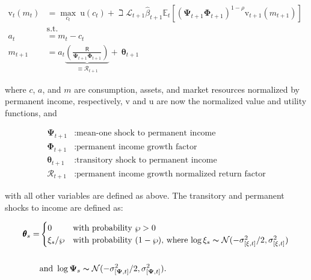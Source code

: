 \documentclass{article}
\newcommand{\DiscFac}{\beta}
\newcommand{\uFunc}{\mathrm{u}}
\newcommand{\vFunc}{\mathrm{v}}
\newcommand{\Alive}{\mathcal{L}}
\newcommand{\Ex}{\mathbb{E}}
\newcommand{\CRRA}{\rho}
\newcommand{\PermGroFac}{\pmb{\Phi}}
\newcommand{\Rfree}{\mathsf{R}}
\newcommand{\PermShk}{\mathbf{\Psi}}
\newcommand{\aNrm}{a}
\newcommand{\cNrm}{c}
\newcommand{\RNrm}{\mathcal{R}}
\newcommand{\TranShkEmp}{\pmb{\theta}}
\newcommand{\mNrm}{m}
\newcommand{\pZero}{\wp}
\begin{document}
\begin{equation}
\begin{align}
    {\vFunc}_{t}({m}_{t}) & = \max_{\cNrm_{t}} ~ \uFunc(\cNrm_{t})+\beth\Alive_{t+1}\hat{\DiscFac}_{t+1}
    \Ex_{t}[(\PermShk_{t+1}\PermGroFac_{t+1})^{1-\CRRA}{\vFunc}_{t+1}({m}_{t+1})]
    \\ & \text{s.t.} & 
    \\ \aNrm_{t} & = {m}_{t}-\cNrm_{t} 
    \\ {m}_{t+1} & = \aNrm_{t}\underbrace{\left(\frac{\Rfree}{\PermShk_{t+1}\PermGroFac_{t+1}}\right)}_{\equiv \RNrm_{t+1}}
    + ~\TranShkEmp_{t+1}
\end{align}
\end{equation}

where $\cNrm$, $\aNrm$, and $\mNrm$ are consumption, assets, and market resources normalized by permanent income, respectively, $\vFunc$ and $\uFunc$ are now the normalized value and utility functions,  and

\begin{equation}
\begin{align}
  \PermShk_{t+1} & :  \text{mean-one shock to permanent income}
    \\ \PermGroFac_{t+1} & :  \text{permanent income growth factor}
    \\ \TranShkEmp_{t+1} & :  \text{transitory shock to permanent income}
    \\ \RNrm_{t+1} & :  \text{permanent income growth normalized return factor}
\end{align}
\end{equation}

with all other variables are defined as above. The transitory and permanent shocks to income are defined as:

\begin{equation}
\begin{align}
\TranShkEmp_{s}  = &
    \begin{cases}
        0\phantom{/\pZero} & \text{with probability $\pZero>0$}
        \\ \xi_{s}/\pZero & \text{with probability $(1-\pZero)$, where
            $\log \xi_{s}\thicksim \mathcal{N}(-\sigma_{[\xi, t]}^{2}/2,\sigma_{[\xi, t]}^{2})$}
    \end{cases}
    \\ \phantom{/\pZero} \\ & \text{and }  \log \PermShk_{s}   \thicksim \mathcal{N}(-\sigma_{[\PermShk, t]}^{2}/2,\sigma_{[\PermShk, t]}^{2}).
  \end{align}
\end{equation}
\end{document}
